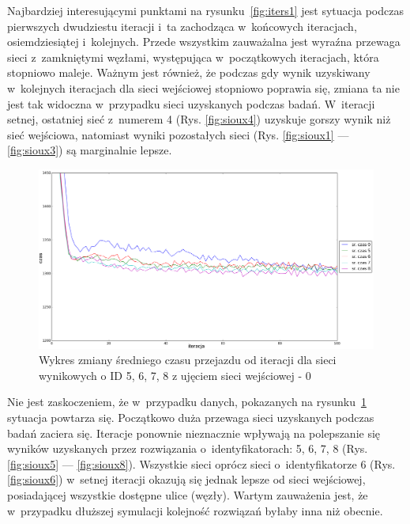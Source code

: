 \documentclass[twoside,12pt]{report}
\begin{document}
Najbardziej interesującymi punktami na rysunku~\ref{fig:iters1} jest sytuacja podczas pierwszych dwudziestu iteracji i~ta zachodząca w~końcowych iteracjach, osiemdziesiątej i~kolejnych. Przede wszystkim zauważalna jest wyraźna przewaga sieci z~zamkniętymi węzłami, występująca w~początkowych iteracjach, która stopniowo maleje. Ważnym jest również, że podczas gdy wynik uzyskiwany w~kolejnych iteracjach dla sieci wejściowej stopniowo poprawia się, zmiana ta nie jest tak widoczna w~przypadku sieci uzyskanych podczas badań. W~iteracji setnej, ostatniej sieć z~numerem 4 (Rys. \ref{fig:sioux4}) uzyskuje gorszy wynik niż sieć wejściowa, natomiast wyniki pozostałych sieci (Rys. \ref{fig:sioux1} --- \ref{fig:sioux3}) są marginalnie lepsze.

\begin{figure}[htbp]
\centering
\includegraphics[width=1\textwidth]{img/iters/iters2}
\caption{Wykres zmiany średniego czasu przejazdu od iteracji dla sieci wynikowych  o ID 5, 6, 7, 8 z ujęciem sieci wejściowej - 0}
\label{fig:iters2}
\end{figure}

Nie jest zaskoczeniem, że w~przypadku danych, pokazanych na rysunku~\ref{fig:iters2} sytuacja powtarza się. Początkowo duża przewaga sieci uzyskanych podczas badań zaciera się. Iteracje ponownie nieznacznie wpływają na polepszanie się wyników uzyskanych przez rozwiązania o~identyfikatorach: 5, 6, 7, 8 (Rys. \ref{fig:sioux5} --- \ref{fig:sioux8}). Wszystkie sieci oprócz sieci o~identyfikatorze 6 (Rys. \ref{fig:sioux6}) w~setnej iteracji okazują się jednak lepsze od sieci wejściowej, posiadającej wszystkie dostępne ulice (węzły). Wartym zauważenia jest, że w~przypadku dłuższej symulacji kolejność rozwiązań byłaby inna niż obecnie.
\end{document}
